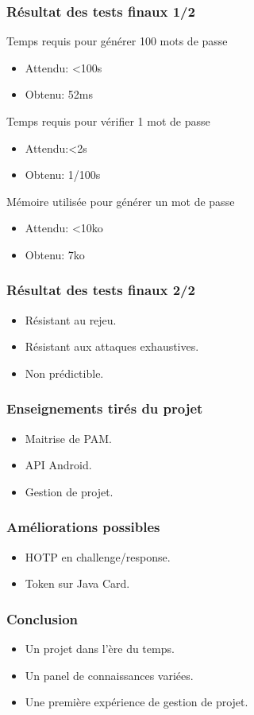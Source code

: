 \documentclass[xcolor=table]{beamer}
\begin{document}
\begin{frame}
\frametitle{Résultat des tests finaux 1/2}
\begin{block}{Temps requis pour générer 100 mots de passe}
\begin{itemize}
\item Attendu: \textless  100s
\item Obtenu: 52ms
\end{itemize}
\end{block}
\begin{block}{Temps requis pour vérifier 1 mot de passe}
\begin{itemize}
\item Attendu:\textless  2s
\item Obtenu: 1/100s
\end{itemize}
\end{block}
\begin{block}{Mémoire utilisée pour générer un mot de passe}
\begin{itemize}
\item Attendu: \textless  10ko
\item Obtenu: 7ko
\end{itemize}
\end{block}

\end{frame}

\begin{frame}
\frametitle{Résultat des tests finaux 2/2}
\begin{itemize}
\item Résistant au rejeu.
\item Résistant aux attaques exhaustives.
\item Non prédictible.
\end{itemize}

\end{frame}

\begin{frame}
\frametitle{Enseignements tirés du projet}
\begin{itemize}
\item Maitrise de PAM.
\item API Android.
\item Gestion de projet.
\end{itemize}
\end{frame}


\begin{frame}
\frametitle{Améliorations possibles}
\begin{itemize}
\item HOTP en challenge/response.
\item Token sur Java Card.
\end{itemize}
\end{frame}

\begin{frame}
\frametitle{Conclusion}
\begin{itemize}
\item Un projet dans l'ère du temps.
\item Un panel de connaissances variées.
\item Une première expérience de gestion de projet.
\end{itemize}
\end{frame}




\end{document}
